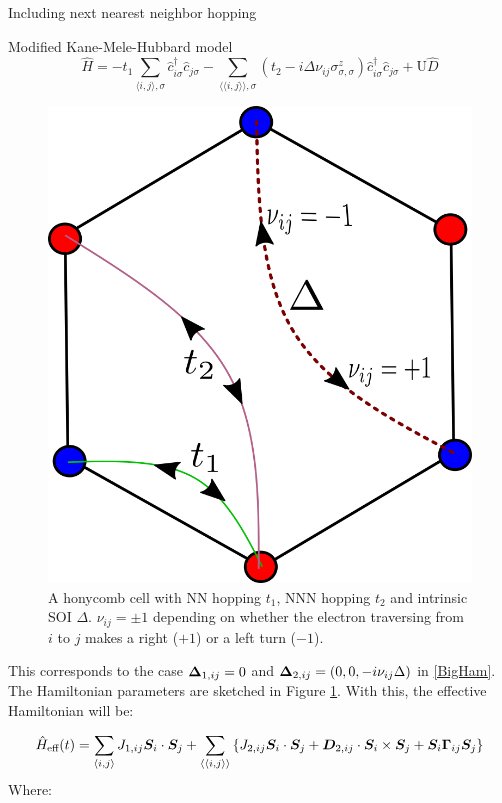 \begin{section}{Including next nearest neighbor hopping}
\begin{subsection}{Modified Kane-Mele-Hubbard model}
\begin{equation}
\label{MKMH}
\hat{H} = - t_1\sum_{\langle i,j \rangle, \sigma} \hat{c}_{i \sigma}^\dagger \hat{c}_{j \sigma} -
	\sum_{\langle \langle i,j \rangle \rangle, \sigma}(t_2 - i\Delta\nu_{ij}\sigma^z_{\sigma, \sigma})\hat{c}_{i \sigma}^\dagger \hat{c}_{j \sigma} + 
	\text{U}\hat{D}
\end{equation}
\begin{figure}
\centering
\includegraphics[width=0.5\columnwidth]{../Figures/kmh.png}
\caption{A honycomb cell with NN hopping $t_1$, NNN hopping $t_2$ and intrinsic SOI $\Delta$. $\nu_{ij} = \pm 1$ depending on whether the electron traversing from $i$ to $j$ makes a right ($+1$) or a left turn ($-1$).}
\label{fig:MKMH}
\vspace*{-6pt}
\end{figure}

This corresponds to the case $\boldsymbol{\Delta}_{1,ij} = 0$ and $\boldsymbol{\Delta}_{2,ij} = (0, 0, -i\nu_{ij} \Delta)$ in \ref{BigHam}. The Hamiltonian parameters are sketched in Figure \ref{fig:MKMH}. With this, the effective Hamiltonian will be:

\begin{equation}
\label{MKMHeff}
\hat{H}_{\text{eff}}(t) = \sum_{\langle i,j \rangle} J_{1,ij}\boldsymbol{S}_i\cdot\boldsymbol{S}_j + \sum_{\langle \langle i,j \rangle \rangle} \left\{ J_{2,ij}\boldsymbol{S}_i\cdot\boldsymbol{S}_j + \boldsymbol{D}_{2,ij}\cdot \boldsymbol{S}_i \times \boldsymbol{S}_j + \boldsymbol{S}_i \boldsymbol{\Gamma}_{ij} \boldsymbol{S}_j \right\}
\end{equation}
Where:


\end{subsection}
\end{section}
